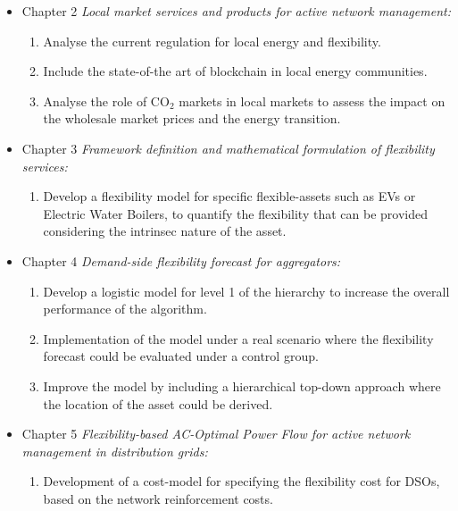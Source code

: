 \begin{itemize}
\item Chapter 2 \textit{Local market services and products for active network management:} 
	\begin{enumerate}
		\item Analyse the current regulation for local energy and flexibility.
		\item Include the state-of-the art of blockchain in local energy communities. 
		\item Analyse the role of CO$_2$ markets in local markets to assess the impact on the wholesale market prices and the energy transition. 
	\end{enumerate}
\item Chapter 3 \textit{Framework definition and mathematical formulation of flexibility services:} 
	\begin{enumerate}
		\item Develop a flexibility model for specific flexible-assets such as EVs or Electric Water Boilers, to quantify the flexibility that can be provided considering the intrinsec nature of the asset. 
	\end{enumerate}
\item Chapter 4 \textit{Demand-side flexibility forecast for aggregators:} 
	\begin{enumerate}
		\item Develop a logistic model for level 1 of the hierarchy to increase the overall performance of the algorithm. 
		\item Implementation of the model under a real scenario where the flexibility forecast could be evaluated under a control group.  
		\item Improve the model by including a hierarchical top-down approach where the location of the asset could be derived. 
	\end{enumerate}
\item Chapter 5 \textit{Flexibility-based AC-Optimal Power Flow for active network management in distribution grids:} 
	\begin{enumerate}
		\item Development of a cost-model for specifying the flexibility cost for DSOs, based on the network reinforcement costs. 

\end{enumerate}
\end{itemize}
